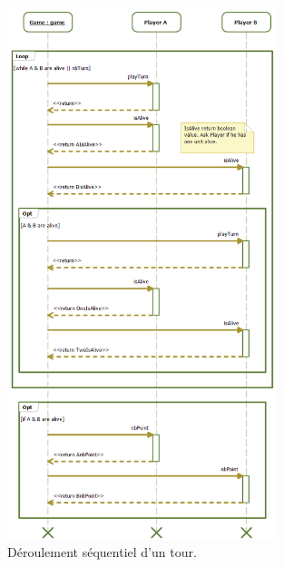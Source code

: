 		\begin{figure}
			\begin{center}
				\includegraphics[width=0.7\textwidth]{figure/game_global_sequence_diagram.png}
			\end{center}
			\caption{Déroulement séquentiel d'un tour.}
			\label{fig:diagrammescouilles}
		\end{figure}		
		
